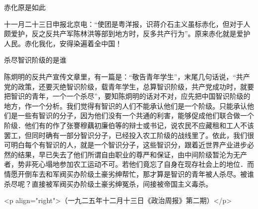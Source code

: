 赤化原是如此

十一月二十三日申报北京电：“使团是粤洋报，识蒋介石主义虽标赤化，但对于人颇爱护，反之反共产军陈林洪等部到地方时，反多共产行为”。原来赤化就是爱护人民。赤化我化，安得染遍着全中国！

杀尽智识阶级的是谁

陈炯明的反共产宣传文章里，有一篇是：“敬告青年学生”，末尾几句话说，“共产党的政策，还要灭绝智识阶级，载青年学生，总算智识阶级，共产党成功时，就要把智识的青年，一个一个杀尽”，要知陈炯明的话对不对，应先把中国智识阶级的地方，作一个分析。我们觉得有智识的人们不能承认他们是一个阶级。只能承认他们是一些有智识的分子，因为他们没有一个共通的利害，能够促成他们联合做一个阶级．他们有的作了张謇穆藕初廉伯等的辩士或书记，说农民不应藏租和工人不该罢工，但同时确有一部分智识分子，已经投入农工阶级的战线里了。依此，我们很可明白每个有智识的人，就是一个智识分子，这些智识分，跟着近世界产业进步必然的结果，早已失去了他们所谓自由职业的尊严和保证，由中间阶级暂沦为无产者，势非死心塌地参加农工运动不可。若他们竟忘了自身在现存社会上的地位．而情愿开倒车去和军阀买办阶级土豪劣绅帮忙，那才算是智识的青年被人杀尽。被谁杀尽呢？直接被军阀买办阶级土豪劣绅冤杀，间接被帝国主义毒杀。

<p align="right">（一九二五年十二月十三日《政治周报》第二期）</p>

